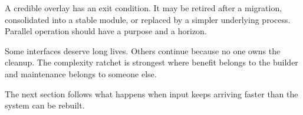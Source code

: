 
A credible overlay has an exit condition. It may be retired after a migration, consolidated into a stable module, or replaced by a simpler underlying process. Parallel operation should have a purpose and a horizon.

Some interfaces deserve long lives. Others continue because no one owns the cleanup. The complexity ratchet is strongest where benefit belongs to the builder and maintenance belongs to someone else.

The next section follows what happens when input keeps arriving faster than the system can be rebuilt.
